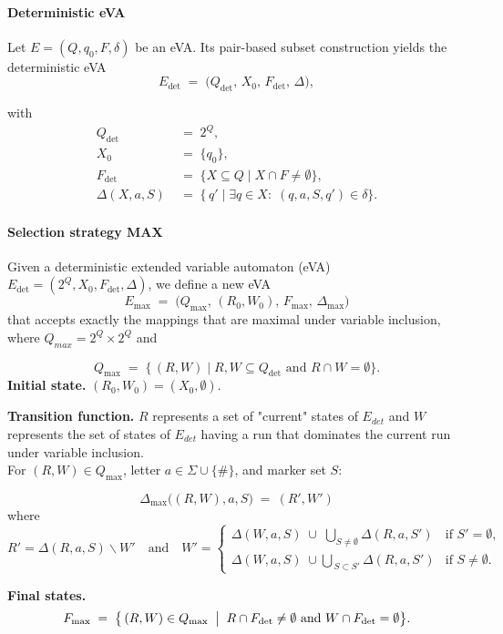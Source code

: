 \paragraph{Deterministic eVA}
Let \(E=(Q,q_{0},F,\delta)\) be an eVA.
Its pair-based subset construction yields the deterministic eVA
\[
  E_{\det}\;=\;
  \bigl(Q_{\det},\,X_{0},\,F_{\det},\,\Delta\bigr),
\]

with
\begin{align*}
  Q_{\det}      &\;=\; 2^{Q},\\
  X_{0}         &\;=\; \{q_{0}\}, \\
  F_{\det}      &\;=\; \{X\subseteq Q \mid X\cap F\neq\emptyset\},\\
  \Delta(X,a,S) &\;=\; \{\,q' \mid \exists q\in X:\;(q,a,S,q')\in\delta\}.
\end{align*}


\paragraph{Selection strategy MAX}
Given a deterministic extended variable automaton (eVA)
$E_{\det}=(2^{Q},X_{0},F_{\det},\Delta)$, we define a new eVA 
$$
  E_{\max}\;=\;
  \bigl(Q_{\max},\,(R_{0},W_{0}),\,F_{\max},\,\Delta_{\max}\bigr)
$$
that accepts exactly the mappings that are maximal under variable inclusion, where $Q_{max} = 2^Q \times 2^Q$ and 

$$
  Q_{\max}
  \;=\;
  \bigl\{\, (R,W)\mid R,W\subseteq Q_{\det}
                 \text{ and } R\cap W=\emptyset \bigr\}.
$$
\medskip
\noindent
\textbf{Initial state.}\;
\((R_{0},W_{0}) = (X_{0},\emptyset)\).

\medskip
\noindent
\textbf{Transition function.} $R$ represents a set of "current" states of $E_{det}$ and $W$ represents the set of states of $E_{det}$ having a run that dominates the current run under variable inclusion.\\
For \((R,W)\in Q_{\max}\), letter \(a\in\Sigma\cup\{\#\}\),  
and marker set \(S\):


$$
  \Delta_{\max}\bigl((R,W),a,S\bigr)
  \;=\  (R',W')
$$
where
$$
  R'=\Delta(R,a,S) \backslash W'
  \quad\text{and}\quad
  W'=\begin{cases}
        \displaystyle
        \Delta(W,a,S)\;\cup\;\bigcup_{S\neq\emptyset}\!\Delta(R,a,S') &
            \text{if } S'=\emptyset,\\[6pt]
        \displaystyle
        \Delta(W,a,S)\;\cup\!
        \bigcup_{\,S \subset S'}\!\Delta(R,a,S') &
            \text{if } S\neq\emptyset.
      \end{cases}
$$

\medskip
\noindent
\textbf{Final states.}
$$
  F_{\max}
  \;=\;
  \bigl\{\, (R,W)\in Q_{\max}\;\bigm|\;
           R\cap F_{\det}\neq\emptyset \text{ and }
           W\cap F_{\det}= \emptyset \bigr\}.
$$

